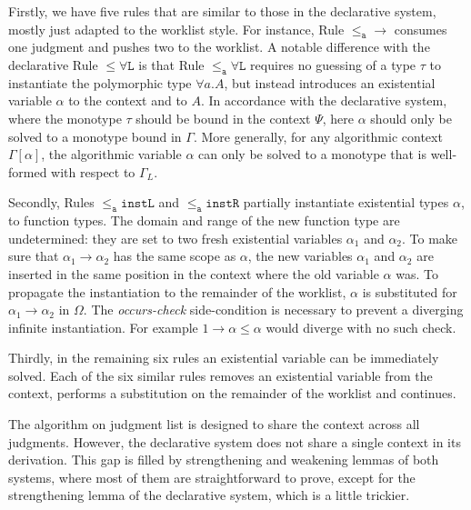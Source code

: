 Firstly, we have five rules that are similar to those in the declarative
system, mostly just adapted to the worklist style. For instance, Rule
$\mathtt{{\le_a}{\to}}$ consumes one judgment and pushes two to the
worklist.  A notable difference with the declarative Rule $\mathtt{{\le}\forall
L}$ is that Rule $\mathtt{{\le_a}\forall L}$ requires no guessing of a type $\tau$ to instantiate
the polymorphic type $\forall a. A$, but instead
introduces an existential variable $\alpha$ to the context and to $A$. In
accordance with the declarative system, where 
the monotype $\tau$ should be bound in the context $\Psi$, here $\alpha$ should only
be solved to a monotype bound in $\Gamma$. More generally, for any algorithmic context $\Gamma[\alpha]$, the algorithmic variable $\alpha$ 
can only be solved to a monotype that is well-formed with respect to $\Gamma_L$.

Secondly, Rules $\mathtt{{\le_a}instL}$ and $\mathtt{{\le_a}instR}$ partially
instantiate existential types $\alpha$, to function types. The domain and range
of the new function type are undetermined: they are set to two
fresh existential variables $\alpha_1$ and $\alpha_2$. To make sure that
$\alpha_1 \to \alpha_2$ has the same scope as $\alpha$, the new variables
$\alpha_1$ and $\alpha_2$ are inserted in the same position in the context
where the old variable $\alpha$ was. To propagate the instantiation to the remainder
of the worklist, $\alpha$ is substituted for $\alpha_1 \to \alpha_2$ in $\Omega$.
The \emph{occurs-check} side-condition is necessary to prevent a diverging
infinite instantiation. For example
$1 \to \alpha \le \alpha$ would diverge with no such check.

Thirdly, in the remaining six rules an existential variable can be immediately
solved. Each of the six similar rules removes an existential variable from the
context,  performs a substitution on the remainder of the worklist and
continues.

The algorithm on judgment list is designed to share the context across all judgments.
However, the declarative system does not share a single context in its derivation.
This gap is filled by strengthening and weakening lemmas of both systems,
where most of them are straightforward to prove,
except for the strengthening lemma of the declarative system, which is a little trickier.

